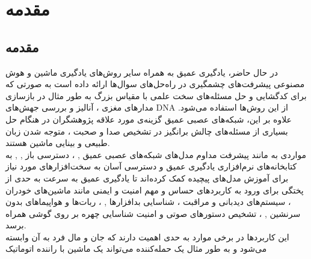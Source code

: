 
\chapter{مقدمه}
\thispagestyle{empty}
\section{مقدمه}
در حال حاضر، یادگیری عمیق
به همراه سایر روش‌های یادگیری ماشین 
و هوش مصنوعی 
پیشرفت‌های چشمگیری در راه‌حل‌های سوال‌ها ارائه داده است به صورتی که برای کدگشایی و حل مسئله‌های سخت علمی با مقیاس بزرگ به طور مثال در بازسازی مدار‌های مغزی
\cite{Helmstaedter2013ConnectomicRO}
، آنالیز و بررسی جهش‌های DNA 
\cite{Xiong2015TheHS}
از این روش‌ها استفاده می‌شود. علاوه بر این، شبکه‌های عصبی عمیق
گزینه‌ی مورد علاقه پژوهشگران در هنگام حل بسیاری از مسئله‌های چالش برانگیز در تشخیص صدا و صحبت
\cite{Hinton2012DeepNN}
، متوجه شدن زبان‌ طبیعی
\cite{Sutskever2014SequenceTS}
و بینایی ماشین
هستند. 
\\
مواردی به مانند پیشرفت مداوم مدل‌های شبکه‌های عصبی عمیق
\cite{Szegedy2016RethinkingTI}, \cite{He2016DeepRL}
، دسترسی باز
 \cite{Vedaldi2015MatConvNetCN}, \cite{Jia2014CaffeCA}, \cite{Abadi2016TensorFlowLM}
 به کتابخانه‌های نرم‌افزاری یادگیری عمیق و دسترسی آسان به سخت‌افزار‌های مورد نیاز برای آموزش مدل‌های پیچیده کمک کرده‌اند تا یادگیری عمیق به سرعت به حدی از پختگی برای ورود به کاربرد‌های حساس و مهم امنیت  و ایمنی  مانند ماشین‌های خودران
، سیستم‌های دیدبانی و مراقبت
 \cite{Najafabadi2014DeepLA}
، شناسایی بدافزار‌ها
 \cite{Papernot2016TowardsTS}, \cite{Grosse2017AdversarialEF}
، ربات‌ها و هواپیماهای بدون سرنشین
 \cite{Mnih2015HumanlevelCT}, \cite{Giusti2016AML}
، تشخیص دستور‌های صوتی
 \cite{Hinton2012DeepNN}
 و امنیت شناسایی چهره 
 بر روی گوشی همراه برسد. 
\\
این کاربرد‌ها در برخی موارد به حدی اهمیت دارند که جان و مال فرد به آن وابسته می‌شود 
\cite{Madry2018TowardsDL}
و به طور مثال یک حمله‌کننده می‌تواند یک ماشین با راننده اتوماتیک
